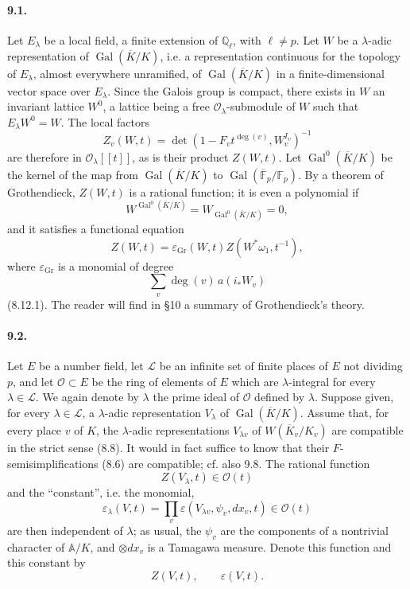 \documentclass[10pt]{article}
\newcommand{\Q}{\mathbb Q}
\newcommand{\F}{\mathbb F}
\newcommand{\Gal}{\operatorname{Gal}}
\providecommand{\Gal}{\operatorname{Gal}}
\providecommand{\LLL}{\mathcal L}
\providecommand{\Gal}{\operatorname{Gal}}
\providecommand{\Gal}{\operatorname{Gal}}
\providecommand{\Gal}{\operatorname{Gal}}
\begin{document}
\paragraph{9.1.} Let $E_\lambda$ be a local field, a finite extension of $\Q_\ell$, with $\ell\ne p$. Let $W$ be a $\lambda$-adic representation of $\Gal(\overline K/K)$, i.e. a representation continuous for the topology of $E_\lambda$, almost everywhere unramified, of $\Gal(\overline K/K)$ in a finite-dimensional vector space over $E_\lambda$. Since the Galois group is compact, there exists in $W$ an invariant lattice $W^0$, a lattice being a free $\mathcal O_\lambda$-submodule of $W$ such that $E_\lambda W^0=W$. The local factors
\[
Z_v(W,t)=\det(1-F_vt^{\deg(v)},W_v^{I_v})^{-1}
\]
are therefore in $\mathcal O_\lambda[[t]]$, as is their product $Z(W,t)$. Let $\Gal^0(\overline K/K)$ be the kernel of the map from $\Gal(\overline K/K)$ to $\Gal(\overline{\F}_p/\F_p)$. By a theorem of Grothendieck, $Z(W,t)$ is a rational function; it is even a polynomial if
\[
W^{\Gal^0(\overline K/K)}=W_{\Gal^0(\overline K/K)}=0,
\]
and it satisfies a functional equation
\[
\tag{9.1.1}
Z(W,t)=\varepsilon_{\mathrm{Gr}}(W,t)Z(W^*\omega_1,t^{-1}),
\]
where $\varepsilon_{\mathrm{Gr}}$ is a monomial of degree
\[
\sum_v\deg(v)\,a(i_*W_v)
\]
(8.12.1). The reader will find in §10 a summary of Grothendieck's theory.

\paragraph{9.2.} Let $E$ be a number field, let $\LLL$ be an infinite set of finite places of $E$ not dividing $p$, and let $\mathcal O\subset E$ be the ring of elements of $E$ which are $\lambda$-integral for every $\lambda\in\LLL$. We again denote by $\lambda$ the prime ideal of $\mathcal O$ defined by $\lambda$. Suppose given, for every $\lambda\in\LLL$, a $\lambda$-adic representation $V_\lambda$ of $\Gal(\overline K/K)$. Assume that, for every place $v$ of $K$, the $\lambda$-adic representations $V_{\lambda v}$ of $W(\overline K_v/K_v)$ are compatible in the strict sense (8.8). It would in fact suffice to know that their $F$-semisimplifications (8.6) are compatible; cf. also 9.8. The rational function
\[
Z(V_\lambda,t)\in\mathcal O(t)
\]
and the “constant”, i.e. the monomial,
\[
\varepsilon_\lambda(V,t)=\prod_v\varepsilon(V_{\lambda v},\psi_v,dx_v,t)\in\mathcal O(t)
\]
are then independent of $\lambda$; as usual, the $\psi_v$ are the components of a nontrivial character of $\mathbb A/K$, and $\otimes dx_v$ is a Tamagawa measure. Denote this function and this constant by
\[
Z(V,t),\qquad \varepsilon(V,t).
\]
\end{document}

